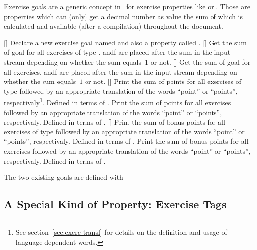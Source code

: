 \documentclass[load-preamble+]{cnltx-doc}
\begin{document}
Exercise goals are a generic concept in \xsim\ for exercise properties like
 or .  Those are properties which can
(only) get a decimal number as value the sum of which is calculated and
available (after a compilation) throughout the document.
\begin{commands}
  []
    Declare a new exercise goal named  and also a property called
    .
  []
    Get the sum of goal  for all exercises of type .
     andf  are placed after the sum in the input
    stream depending on whether the sum equals~$1$ or not.
  []
    Get the sum of goal  for all exercises.  andf
     are placed after the sum in the input stream depending on
    whether the sum equals~$1$ or not.
  []
    Print the sum of points for all exercises of type  followed by
    an appropriate translation of the words \enquote{point} or
    \enquote{points}, respectivaly\footnote{See section~\ref{sec:exerc-transl}
      for details on the definition and usage of language dependent words.}.
    Defined in terms of .
    Print the sum of points for all exercises followed by an appropriate
    translation of the words \enquote{point} or \enquote{points},
    respectivaly.  Defined in terms of .
  []
    Print the sum of bonus points for all exercises of type 
    followed by an appropriate translation of the words \enquote{point} or
    \enquote{points}, respectivaly.  Defined in terms of
    .
    Print the sum of bonus points for all exercises followed by an appropriate
    translation of the words \enquote{point} or \enquote{points},
    respectivaly.  Defined in terms of .
\end{commands}

The two existing goals are defined with
\begin{sourcecode}
\end{sourcecode}

\subsection{A Special Kind of Property: Exercise Tags}
\end{document}
